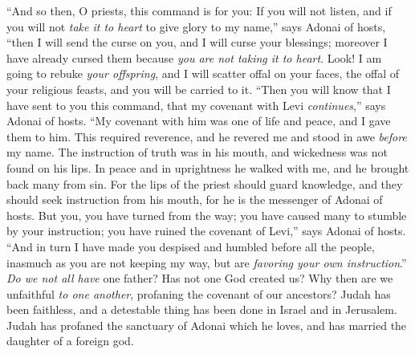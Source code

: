 \begin{biblechapter} %
\verse “And so then, O priests, this command is for you:
\verse If you will not listen, and if you will not \textit{take it to heart} to give glory to my name,” says Adonai of hosts, “then I will send the curse on you, and I will curse your blessings; moreover I have already cursed them because \textit{you are not taking it to heart}.
\verse Look! I am going to rebuke \textit{your offspring}, and I will scatter offal on your faces, the offal of your religious feasts, and you will be carried to it.
\verse “Then you will know that I have sent to you this command, that my covenant with Levi \textit{continues},” says Adonai of hosts.
\verse “My covenant with him was one of life and peace, and I gave them to him. This required reverence, and he revered me and stood in awe \textit{before} my name.
\verse The instruction of truth was in his mouth, and wickedness was not found on his lips. In peace and in uprightness he walked with me, and he brought back many from sin.
\verse For the lips of the priest should guard knowledge, and they should seek instruction from his mouth, for he is the messenger of Adonai of hosts.
\verse But you, you have turned from the way; you have caused many to stumble by your instruction; you have ruined the covenant of Levi,” says Adonai of hosts.
\verse “And in turn I have made you despised and humbled before all the people, inasmuch as you are not keeping my way, but are \textit{favoring your own instruction}.”
 \textit{Do we not all have} one father? Has not one God created us? Why then are we unfaithful \textit{to one another}, profaning the covenant of our ancestors?
\verse Judah has been faithless, and a detestable thing has been done in Israel and in Jerusalem. Judah has profaned the sanctuary of Adonai which he loves, and has married the daughter of a foreign god.

\end{biblechapter}
